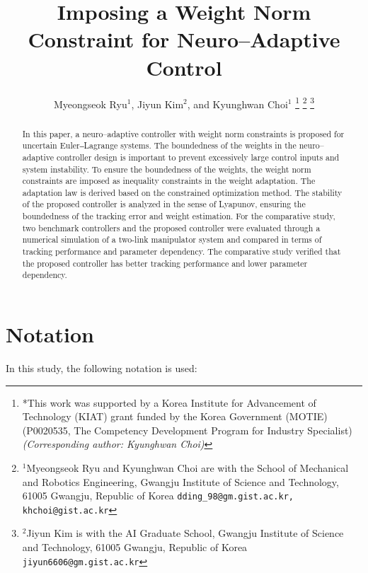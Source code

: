 \documentclass[letterpaper, 10 pt, conference]{ieeeconf}  %
\title{\LARGE \bf
Imposing a Weight Norm Constraint for Neuro–Adaptive Control
}
\author{Myeongseok Ryu$^{1}$, Jiyun Kim$^{2}$, and Kyunghwan Choi$^{1}$%
\thanks{*This work was supported by a Korea Institute for Advancement of Technology (KIAT) grant funded by the Korea Government (MOTIE) (P0020535, The Competency Development Program for Industry Specialist) \it{(Corresponding author: Kyunghwan Choi)}}%
\thanks{$^{1}$Myeongseok Ryu and Kyunghwan Choi are with the School of Mechanical and Robotics Engineering, Gwangju Institute of Science and Technology, 61005 Gwangju, Republic of Korea {\tt\small dding\_98@gm.gist.ac.kr, khchoi@gist.ac.kr}}%
\thanks{$^{2}$Jiyun Kim is with the AI Graduate School, Gwangju Institute of Science and Technology, 61005 Gwangju, Republic of Korea 
        {\tt\small jiyun6606@gm.gist.ac.kr}}%
}
\begin{document}
\maketitle
\thispagestyle{empty}
\pagestyle{empty}

\begin{abstract}

In this paper, a neuro–adaptive controller with weight norm constraints is proposed for uncertain Euler‒Lagrange systems. 
The boundedness of the weights in the neuro–adaptive controller design is important to prevent excessively large control inputs and system instability. 
To ensure the boundedness of the weights, the weight norm constraints are imposed as inequality constraints in the weight adaptation. 
The adaptation law is derived based on the constrained optimization method. 
The stability of the proposed controller is analyzed in the sense of Lyapunov, ensuring the boundedness of the tracking error and weight estimation. 
For the comparative study, two benchmark controllers and the proposed controller were evaluated through a numerical simulation of a two-link manipulator system and compared in terms of tracking performance and parameter dependency. 
The comparative study verified that the proposed controller has better tracking performance and lower parameter dependency.

\end{abstract}



\section*{Notation}
In this study, the following notation is used:
\end{document}
